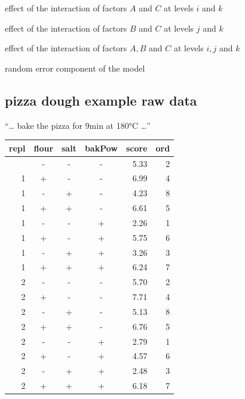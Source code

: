 \documentclass[
  a4paper,
]{scrbook}
\let\olddescription\description
\let\endolddescription\enddescription
\renewenvironment{description}{
          \begin{spacing}{1.5}\olddescription
        }{
          \endolddescription\end{spacing}
        }
\begin{document}
\begin{description}
\item[\((\alpha\gamma)_{ik}\)]
effect of the interaction of factors \(A\) and \(C\) at levels \(i\) and
\(k\)
\item[\((\beta\gamma)_{jk}\)]
effect of the interaction of factors \(B\) and \(C\) at levels \(j\) and
\(k\)
\item[\((\alpha\beta\gamma)_{ijk}\)]
effect of the interaction of factors \(A,B\) and \(C\) at levels \(i,j\)
and \(k\)
\item[\(\epsilon_{ijkl}\)]
random error component of the model
\end{description}

\subsection{pizza dough example raw
data}\label{pizza-dough-example-raw-data}

``\ldots{} bake the pizza for 9min at 180°C \ldots{}''

\begin{table}
\fontsize{12.0pt}{14.0pt}\selectfont
\begin{tabular*}{\linewidth}{@{\extracolsep{\fill}}rcccrr}
\toprule
repl & flour & salt & bakPow & score & ord \\ 
\midrule\addlinespace[2.5pt]
1 & - & - & - & 5.33 & 2 \\ 
1 & + & - & - & 6.99 & 4 \\ 
1 & - & + & - & 4.23 & 8 \\ 
1 & + & + & - & 6.61 & 5 \\ 
1 & - & - & + & 2.26 & 1 \\ 
1 & + & - & + & 5.75 & 6 \\ 
1 & - & + & + & 3.26 & 3 \\ 
1 & + & + & + & 6.24 & 7 \\ 
2 & - & - & - & 5.70 & 2 \\ 
2 & + & - & - & 7.71 & 4 \\ 
2 & - & + & - & 5.13 & 8 \\ 
2 & + & + & - & 6.76 & 5 \\ 
2 & - & - & + & 2.79 & 1 \\ 
2 & + & - & + & 4.57 & 6 \\ 
2 & - & + & + & 2.48 & 3 \\ 
2 & + & + & + & 6.18 & 7 \\ 
\bottomrule
\end{tabular*}
\end{table}
\end{document}
